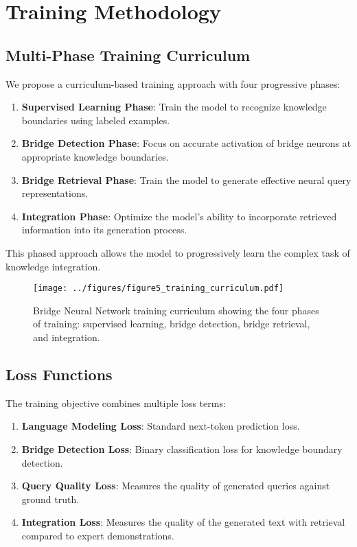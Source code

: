 \documentclass[9pt,a4paper,twocolumn,twoside]{tau-class/tau}
\begin{document}
\section{Training Methodology}

\subsection{Multi-Phase Training Curriculum}

    We propose a curriculum-based training approach with four progressive phases:

    \begin{enumerate}
        \item \textbf{Supervised Learning Phase}: Train the model to recognize knowledge boundaries using labeled examples.
        \item \textbf{Bridge Detection Phase}: Focus on accurate activation of bridge neurons at appropriate knowledge boundaries.
        \item \textbf{Bridge Retrieval Phase}: Train the model to generate effective neural query representations.
        \item \textbf{Integration Phase}: Optimize the model's ability to incorporate retrieved information into its generation process.
    \end{enumerate}

    This phased approach allows the model to progressively learn the complex task of knowledge integration.

    \begin{figure}[h]
        \centering
        \texttt{[image: ../figures/figure5\_training\_curriculum.pdf]}
        \caption{Bridge Neural Network training curriculum showing the four phases of training: supervised learning, bridge detection, bridge retrieval, and integration.}
        \label{fig:curriculum}
    \end{figure}

\subsection{Loss Functions}

    The training objective combines multiple loss terms:

    \begin{enumerate}
        \item \textbf{Language Modeling Loss}: Standard next-token prediction loss.
        \item \textbf{Bridge Detection Loss}: Binary classification loss for knowledge boundary detection.
        \item \textbf{Query Quality Loss}: Measures the quality of generated queries against ground truth.
        \item \textbf{Integration Loss}: Measures the quality of the generated text with retrieval compared to expert demonstrations.
    \end{enumerate}
\end{document}
